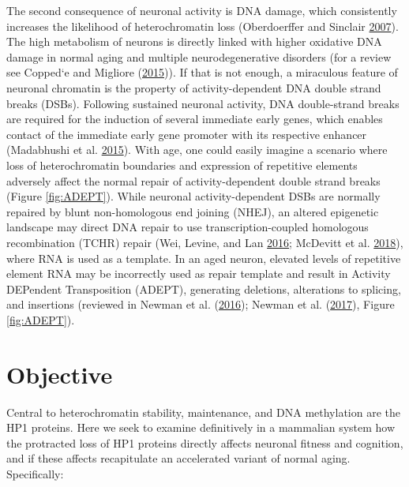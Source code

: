 \documentclass[onehalf,12pt]{beavtex}
\begin{document}
  The second consequence of neuronal activity is DNA damage, which
  consistently increases the likelihood of heterochromatin loss
  (Oberdoerffer and Sinclair
  \protect\hyperlink{ref-Oberdoerfferrolenucleararchitecture2007}{2007}).
  The high metabolism of neurons is directly linked with higher oxidative
  DNA damage in normal aging and multiple neurodegenerative disorders (for
  a review see Copped\a`e and Migliore
  (\protect\hyperlink{ref-CoppedeDNAdamageneurodegenerative2015}{2015})).
  If that is not enough, a miraculous feature of neuronal chromatin is the
  property of activity-dependent DNA double strand breaks (DSBs).
  Following sustained neuronal activity, DNA double-strand breaks are
  required for the induction of several immediate early genes, which
  enables contact of the immediate early gene promoter with its respective
  enhancer (Madabhushi et al.
  \protect\hyperlink{ref-MadabhushiActivityInducedDNABreaks2015}{2015}).
  With age, one could easily imagine a scenario where loss of
  heterochromatin boundaries and expression of repetitive elements
  adversely affect the normal repair of activity-dependent double strand
  breaks (Figure \ref{fig:ADEPT}). While neuronal activity-dependent DSBs
  are normally repaired by blunt non-homologous end joining (NHEJ), an
  altered epigenetic landscape may direct DNA repair to use
  transcription-coupled homologous recombination (TCHR) repair (Wei,
  Levine, and Lan
  \protect\hyperlink{ref-WeiTranscriptioncoupledhomologousrecombination2016}{2016};
  McDevitt et al.
  \protect\hyperlink{ref-McDevittHowRNAtranscripts2018}{2018}), where RNA
  is used as a template. In an aged neuron, elevated levels of repetitive
  element RNA may be incorrectly used as repair template and result in
  Activity DEPendent Transposition (ADEPT), generating deletions,
  alterations to splicing, and insertions (reviewed in Newman et al.
  (\protect\hyperlink{ref-NewmanActivityDEPendentTransposition2016}{2016});
  Newman et al.
  (\protect\hyperlink{ref-NewmanActivityDEPendentTransposition2017}{2017}),
  Figure \ref{fig:ADEPT}).
  
  \newpage
  
  \section{Objective}\label{objective}
  
  Central to heterochromatin stability, maintenance, and DNA methylation
  are the HP1 proteins. Here we seek to examine definitively in a
  mammalian system how the protracted loss of HP1 proteins directly
  affects neuronal fitness and cognition, and if these affects
  recapitulate an accelerated variant of normal aging. Specifically:
  
\end{document}
